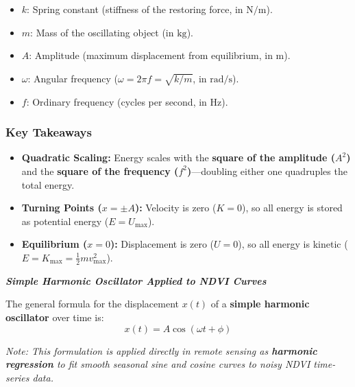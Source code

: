 \documentclass[12pt, letterpaper]{article}
\begin{document}
\begin{itemize}
    \item $k$: Spring constant (stiffness of the restoring force, in $\text{N/m}$).
    \item $m$: Mass of the oscillating object (in $\text{kg}$).
    \item $A$: Amplitude (maximum displacement from equilibrium, in $\text{m}$).
    \item $\omega$: Angular frequency ($\omega = 2\pi f = \sqrt{k/m}$, in $\text{rad/s}$).
    \item $f$: Ordinary frequency (cycles per second, in $\text{Hz}$).
\end{itemize}

\subsubsection*{Key Takeaways}
\begin{itemize}
    \item \textbf{Quadratic Scaling:} Energy scales with the \textbf{square of the amplitude ($A^2$)} and the \textbf{square of the frequency ($f^2$)}---doubling either one quadruples the total energy.
    \item \textbf{Turning Points ($x = \pm A$):} Velocity is zero ($K = 0$), so all energy is stored as potential energy ($E = U_{\max}$).
    \item \textbf{Equilibrium ($x = 0$):} Displacement is zero ($U = 0$), so all energy is kinetic ($E = K_{\max} = \frac{1}{2}mv_{\max}^2$).
\end{itemize}





\bigskip 
\LARGE
\begin{flushleft}
\textbf{\textit{Simple Harmonic Oscillator Applied to NDVI Curves}}
\end{flushleft}
\normalsize

The general formula for the displacement $x(t)$ of a \textbf{simple harmonic oscillator} over time is:
\begin{equation}
x(t) = A \cos(\omega t + \phi)
\end{equation}

\noindent \textit{Note: This formulation is applied directly in remote sensing as \textbf{harmonic regression} to fit smooth seasonal sine and cosine curves to noisy NDVI time-series data.}
\end{document}
